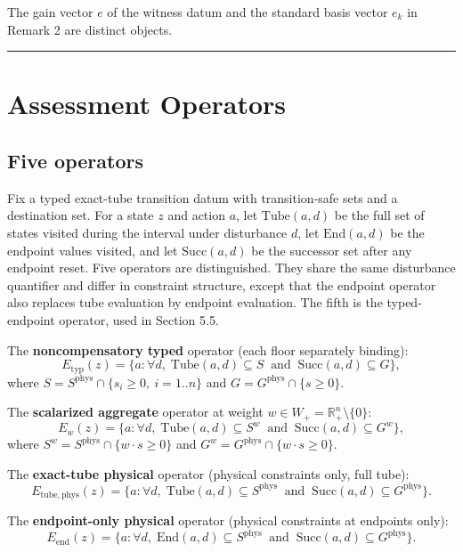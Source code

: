 \documentclass[3p,11pt]{elsarticle}
\begin{document}
The gain vector \(e\) of the witness datum and the standard basis vector \(e_k\) in Remark 2 are distinct objects.

\begin{center}\rule{0.5\linewidth}{0.5pt}\end{center}

\section{Assessment Operators}\label{assessment-operators}

\subsection{Five operators}\label{five-operators}

Fix a typed exact-tube transition datum with transition-safe sets and a
destination set. For a state \(z\) and action \(a\), let
\(\mathrm{Tube}(a,d)\) be the full set of states visited during the
interval under disturbance \(d\), let \(\mathrm{End}(a,d)\) be the
endpoint values visited, and let \(\mathrm{Succ}(a,d)\) be the successor
set after any endpoint reset. Five operators are distinguished. They share the same disturbance quantifier and differ in constraint structure, except that the endpoint operator also replaces tube evaluation by endpoint evaluation. The fifth is the typed-endpoint operator, used in Section 5.5.

The \textbf{noncompensatory typed} operator (each floor separately
binding):
\[E_{\mathrm{typ}}(z) = \{ a : \forall d,\; \mathrm{Tube}(a,d) \subseteq S \ \text{ and } \ \mathrm{Succ}(a,d) \subseteq G \},\]
where \(S = S^{\mathrm{phys}} \cap \{ s_i \ge 0,\ i = 1..n \}\) and
\(G = G^{\mathrm{phys}} \cap \{ s \ge 0 \}\).

The \textbf{scalarized aggregate} operator at weight
\(w \in W_+ = \mathbb{R}^n_+ \setminus \{0\}\):
\[E_w(z) = \{ a : \forall d,\; \mathrm{Tube}(a,d) \subseteq S^w \ \text{ and } \ \mathrm{Succ}(a,d) \subseteq G^w \},\]
where \(S^w = S^{\mathrm{phys}} \cap \{ w \cdot s \ge 0 \}\) and
\(G^w = G^{\mathrm{phys}} \cap \{ w \cdot s \ge 0 \}\).

The \textbf{exact-tube physical} operator (physical constraints only,
full tube):
\[E_{\mathrm{tube,phys}}(z) = \{ a : \forall d,\; \mathrm{Tube}(a,d) \subseteq S^{\mathrm{phys}} \ \text{ and } \ \mathrm{Succ}(a,d) \subseteq G^{\mathrm{phys}} \}.\]

The \textbf{endpoint-only physical} operator (physical constraints at
endpoints only):
\[E_{\mathrm{end}}(z) = \{ a : \forall d,\; \mathrm{End}(a,d) \subseteq S^{\mathrm{phys}} \ \text{ and } \ \mathrm{Succ}(a,d) \subseteq G^{\mathrm{phys}} \}.\]
\end{document}
